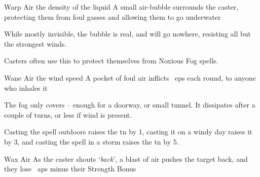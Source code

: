 \ifodd\value{diceNo}

  {}%
  {Warp}%
  {Air}%
  {the density of the liquid}%
  {A small air-bubble surrounds the caster, protecting them from foul gasses and allowing them to go underwater}%
  {While mostly invisible, the bubble is real, and will go nowhere, resisting all but the strongest winds.

    Casters often use this to protect themselves from Noxious Fog spells.}

  {}%
  {Wane}%
  {Air}%
  {the wind speed}%
  {A pocket of foul air inflicts ~\glspl{ep} each round, to anyone who inhales it}%
  {

    The fog only covers  -- enough for a doorway, or small tunnel.
    It dissipates after a couple of turns, or less if wind is present.

    Casting the spell outdoors raises the \gls{tn} by 1, casting it on a windy day raises it by 3, and casting the spell in a storm raises the \gls{tn} by 5.
  }

\else

  {}%
  {Wax}%
  {Air}%
  {}%
  {As the caster shouts `\textit{back}', a blast of air pushes the target back, and they lose ~\glspl{ap} minus their Strength Bonus}%
  {}

\fi
{}

